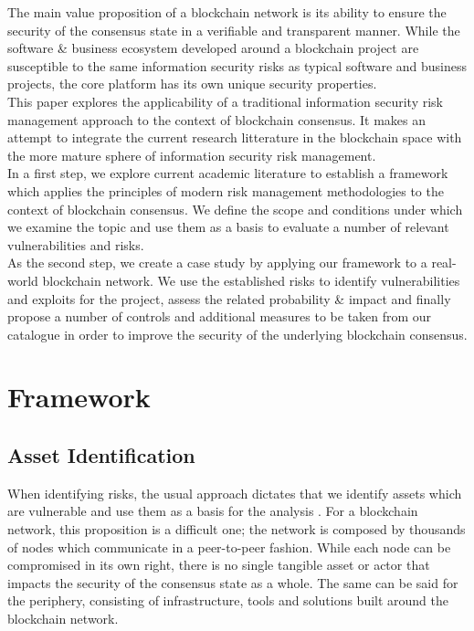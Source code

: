 \documentclass[12pt,a4paper]{article}
\begin{document}
The main value proposition of a blockchain network is its ability to ensure the security of the consensus state in a verifiable and transparent manner. While the software \& business ecosystem developed around a blockchain project are susceptible to the same information security risks as typical software and business projects, the core platform has its own unique security properties.\\

This paper explores the applicability of a traditional information security risk management approach to the context of blockchain consensus. It makes an attempt to integrate the current research litterature in the blockchain space with the more mature sphere of information security risk management.\\

In a first step, we explore current academic literature to establish a framework which applies the principles of modern risk management methodologies to the context of blockchain consensus. We define the scope and conditions under which we examine the topic and use them as a basis to evaluate a number of relevant vulnerabilities and risks.\\

As the second step, we create a case study by applying our framework to a real-world blockchain network. We use the established risks to identify vulnerabilities and exploits for the project, assess the related probability \& impact and finally propose a number of controls and additional measures to be taken from our catalogue in order to improve the security of the underlying blockchain consensus.\\

\section{Framework}

\subsection{Asset Identification}

When identifying risks, the usual approach dictates that we identify assets which are vulnerable and use them as a basis for the analysis \cite{iso}. For a blockchain network, this proposition is a difficult one; the network is composed by thousands of nodes which communicate in a peer-to-peer fashion. While each node can be compromised in its own right, there is no single tangible asset or actor that impacts the security of the consensus state as a whole. The same can be said for the periphery, consisting of infrastructure, tools and solutions built around the blockchain network.\\
\end{document}
